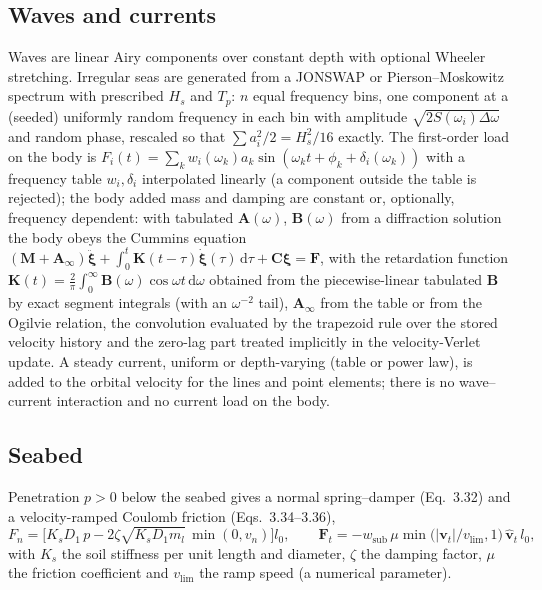 \documentclass[11pt,a4paper]{article}
\newcommand{\vect}[1]{\boldsymbol{#1}}
\begin{document}
\subsection{Waves and currents}
Waves are linear Airy components over constant depth with optional Wheeler stretching. Irregular seas are generated from a JONSWAP or Pierson--Moskowitz spectrum with prescribed $H_s$ and $T_p$: $n$ equal frequency bins, one component at a (seeded) uniformly random frequency in each bin with amplitude $\sqrt{2S(\omega_i)\Delta\omega}$ and random phase, rescaled so that $\sum a_i^2/2=H_s^2/16$ exactly. The first-order load on the body is $F_i(t)=\sum_k w_i(\omega_k)a_k\sin(\omega_kt+\phi_k+\delta_i(\omega_k))$ with a frequency table $w_i,\delta_i$ interpolated linearly (a component outside the table is rejected); the body added mass and damping are constant or, optionally, frequency dependent: with tabulated $\mathbf A(\omega)$, $\mathbf B(\omega)$ from a diffraction solution the body obeys the Cummins equation $(\mathbf M+\mathbf A_\infty)\ddot{\vect\xi}+\int_0^t\mathbf K(t-\tau)\dot{\vect\xi}(\tau)\,\mathrm d\tau+\mathbf C\vect\xi=\vect F$, with the retardation function $\mathbf K(t)=\tfrac2\pi\int_0^\infty\mathbf B(\omega)\cos\omega t\,\mathrm d\omega$ obtained from the piecewise-linear tabulated $\mathbf B$ by exact segment integrals (with an $\omega^{-2}$ tail), $\mathbf A_\infty$ from the table or from the Ogilvie relation, the convolution evaluated by the trapezoid rule over the stored velocity history and the zero-lag part treated implicitly in the velocity-Verlet update. A steady current, uniform or depth-varying (table or power law), is added to the orbital velocity for the lines and point elements; there is no wave--current interaction and no current load on the body.

\subsection{Seabed}
Penetration $p>0$ below the seabed gives a normal spring--damper (Eq.~3.32) and a velocity-ramped Coulomb friction (Eqs.~3.34--3.36),
\begin{equation}
F_n=\bigl[K_sD_1\,p-2\zeta\sqrt{K_sD_1m_l}\,\min(0,v_n)\bigr]l_0,\qquad
\vect F_t=-w_{\mathrm{sub}}\,\mu\min\!\bigl(\lvert\vect v_t\rvert/v_{\lim},1\bigr)\,\hat{\vect v}_t\,l_0 ,
\end{equation}
with $K_s$ the soil stiffness per unit length and diameter, $\zeta$ the damping factor, $\mu$ the friction coefficient and $v_{\lim}$ the ramp speed (a numerical parameter).
\end{document}
